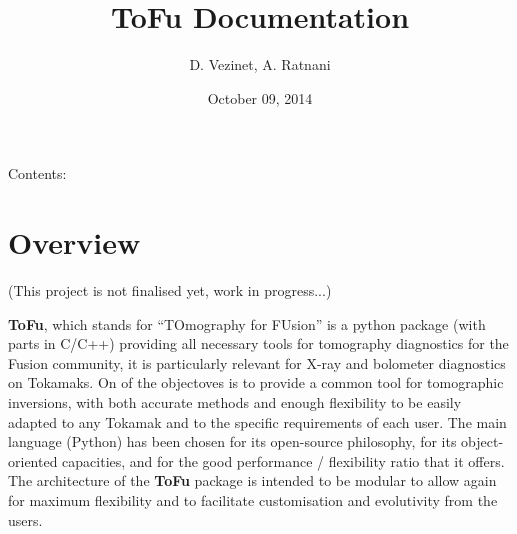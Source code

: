\documentclass[letterpaper,10pt,english]{sphinxmanual}
\title{ToFu Documentation}
\date{October 09, 2014}
\author{D. Vezinet, A. Ratnani}
\begin{document}
\maketitle
\tableofcontents
{}\label{index::doc}


Contents:


\chapter{Overview}
\label{overview:overview}\label{overview::doc}\label{overview:welcome-to-tofu-s-documentation}\label{overview:id1}
(This project is not finalised yet, work in progress...)

\textbf{ToFu}, which stands for ``TOmography for FUsion'' is a python package (with parts in C/C++) providing all necessary tools for tomography diagnostics for the Fusion community, it is particularly relevant for X-ray and bolometer diagnostics on Tokamaks. On of the objectoves is to provide a common tool for tomographic inversions, with both accurate methods and enough flexibility to be easily adapted to any Tokamak and to the specific requirements of each user. The main language (Python) has been chosen for its open-source philosophy, for its object-oriented capacities, and for the good performance / flexibility ratio that it offers. The architecture of the \textbf{ToFu} package is intended to be modular to allow again for maximum flexibility and to facilitate customisation and evolutivity from the users.
\end{document}
